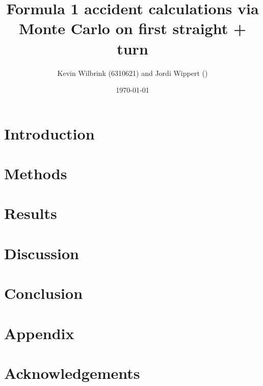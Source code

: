 \documentclass[12pt]{article}
\title{\textbf{Formula 1 accident calculations via Monte Carlo on first straight + turn}}
\date{\today}
\author{Kevin Wilbrink (6310621) and Jordi Wippert ()}
\begin{document}
	\maketitle

	\begin{multicols*}{2}
		\begin{abstract}
			\textbf{}
		\end{abstract}
		

		\section{Introduction}
		

		\section{Methods}
		

		\section{Results}
		

		\section{Discussion}
		

		\section{Conclusion}
		

		\section*{Appendix}
		

		\section*{Acknowledgements}
		

		
	\end{multicols*}
\end{document}
